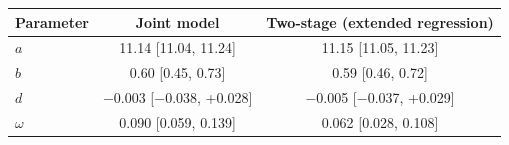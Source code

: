 \footnotesize
\begin{tabular}{lcc}
\toprule
Parameter & Joint model & Two-stage (extended regression) \\
\midrule
$a$ & 11.14 [11.04, 11.24] & 11.15 [11.05, 11.23] \\
$b$ & 0.60 [0.45, 0.73] & 0.59 [0.46, 0.72] \\
$d$ & $-$0.003 [$-$0.038, +0.028] & $-$0.005 [$-$0.037, +0.029] \\
$\omega$ & 0.090 [0.059, 0.139] & 0.062 [0.028, 0.108] \\
\bottomrule
\end{tabular}
